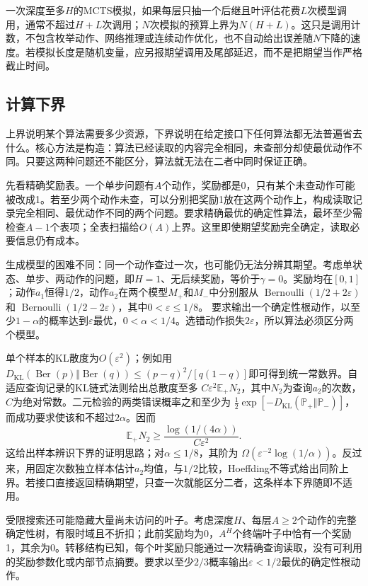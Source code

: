 一次深度至多$H$的MCTS模拟，如果每层只抽一个后继且叶评估花费$L$次模型调用，通常不超过$H+L$次调用；$N$次模拟的预算上界为$N(H+L)$。这只是调用计数，不包含枚举动作、网络推理或连续动作优化，也不自动给出误差随$N$下降的速度。若模拟长度是随机变量，应另报期望调用及尾部延迟，而不是把期望当作严格截止时间。

\subsection{计算下界}
\label{sec:rl-planning-lower-bounds}

上界说明某个算法需要多少资源，下界说明在给定接口下任何算法都无法普遍省去什么。核心方法是构造：算法已经读取的内容完全相同，未查部分却使最优动作不同。只要这两种问题还不能区分，算法就无法在二者中同时保证正确。

先看精确奖励表。一个单步问题有$A$个动作，奖励都是0，只有某个未查动作可能被改成1。若至少两个动作未查，可以分别把奖励1放在这两个动作上，构成读取记录完全相同、最优动作不同的两个问题。要求精确最优的确定性算法，最坏至少需检查$A-1$个表项；全表扫描给$O(A)$上界。这里即使期望奖励完全确定，读取必要信息仍有成本。

生成模型的困难不同：同一个动作查过一次，也可能仍无法分辨其期望。考虑单状态、单步、两动作的问题，即$H=1$、无后续奖励，等价于$\gamma=0$。奖励均在$[0,1]$；动作$a_1$恒得$1/2$，动作$a_2$在两个模型$M_+$和$M_-$中分别服从
$\operatorname{Bernoulli}(1/2+2\varepsilon)$和
$\operatorname{Bernoulli}(1/2-2\varepsilon)$，其中$0<\varepsilon\leq1/8$。
要求输出一个确定性根动作，以至少$1-\alpha$的概率达到$\varepsilon$最优，$0<\alpha<1/4$。选错动作损失$2\varepsilon$，所以算法必须区分两个模型。

单个样本的KL散度为$O(\varepsilon^2)$；例如用
$D_{\mathrm{KL}}(\operatorname{Ber}(p)\Vert\operatorname{Ber}(q))
\leq(p-q)^2/[q(1-q)]$即可得到统一常数界。自适应查询记录的KL链式法则给出总散度至多
$C\varepsilon^2\mathbb E_+N_2$，其中$N_2$为查询$a_2$的次数，$C$为绝对常数。二元检验的两类错误概率之和至少为
$\tfrac12\exp[-D_{\mathrm{KL}}(\mathbb P_+\Vert\mathbb P_-)]$，
而成功要求使该和不超过$2\alpha$。因而
\[
 \mathbb E_+N_2\geq
 \frac{\log(1/(4\alpha))}{C\varepsilon^2}.
\]
这给出样本辨识下界的证明思路；对$\alpha\leq1/8$，其阶为
$\Omega(\varepsilon^{-2}\log(1/\alpha))$。反过来，用固定次数独立样本估计$a_2$均值，与$1/2$比较，Hoeffding不等式给出同阶上界。若接口直接返回精确期望，只查一次就能区分二者，这条样本下界随即不适用。

受限搜索还可能隐藏大量尚未访问的叶子。考虑深度$H$、每层$A\geq2$个动作的完整确定性树，有限时域且不折扣；此前奖励均为0，$A^H$个终端叶子中恰有一个奖励1，其余为0。转移结构已知，每个叶奖励只能通过一次精确查询读取，没有可利用的奖励参数化或内部节点摘要。要求以至少$2/3$概率输出$\varepsilon<1/2$最优的确定性根动作。

